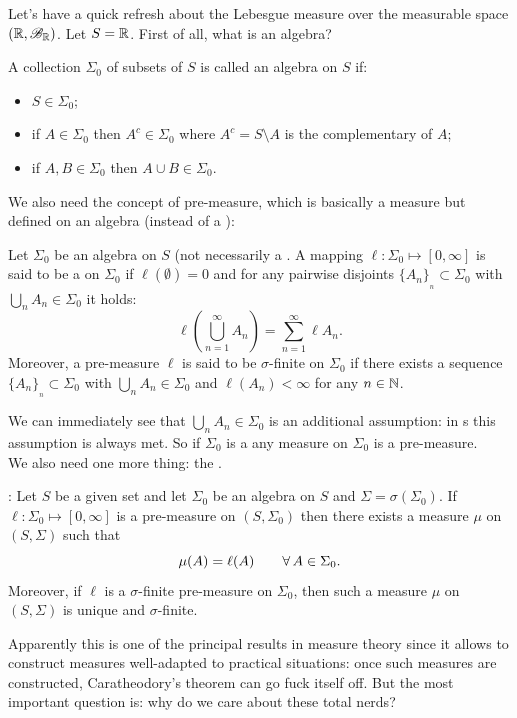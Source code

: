 \documentclass{report}
\begin{document}
\begin{revise}
Let's have a quick refresh about the Lebesgue measure over the measurable space $(\mathbb{R},\mathscr{B}_{\mathbb{R}})$. Let $S=\mathbb{R}$. First of all, what is an algebra?
\begin{definition}
	A collection $\Sigma_0$ of subsets of $S$ is called an algebra on $S$ if:
	\begin{itemize}
		\item $S\in\Sigma_0$;
		\item if $A\in\Sigma_0$ then $A^c\in\Sigma_0$ where $A^c=S\setminus A$ is the complementary of $A$;
		\item if $A,B\in\Sigma_0$ then $A\cup B\in\Sigma_0$.
	\end{itemize}
\end{definition}
We also need the concept of pre-measure, which is basically a measure but defined on an algebra (instead of a \sa{}):
\begin{definition}
	Let $\Sigma_0$ be an algebra on $S$ (not necessarily a \sa{}. A mapping $\ell:\Sigma_0\mapsto[0,\infty]$ is said to be a  on $\Sigma_0$ if $\ell(\emptyset)=0$ and for any pairwise disjoints $\{A_n\}_{_n}\subset\Sigma_0$ with $\bigcup_nA_n\in\Sigma_0$ it holds:
	\[\ell\left(\bigcup_{n=1}^\infty A_n\right)=\sum_{n=1}^{\infty}\ell{A_n}.  \] 
	Moreover, a pre-measure $\ell$ is said to be $\sigma$-finite on $\Sigma_0$ if there exists a sequence $\{A_n\}_{_n}\subset\Sigma_0$ with $\bigcup_nA_n\in\Sigma_0$ and $\ell(A_n)<\infty$ for any $n\in\mathbb{N}$.
\end{definition}
We can immediately see that $\bigcup_nA_n\in\Sigma_0$ is an additional assumption: in \sa s this assumption is always met. So if $\Sigma_0$ is a \sa{} any measure on $\Sigma_0$ is a pre-measure. \\
We also need one more thing: the .
\begin{theorem}
	: Let $S$ be a given set and let $\Sigma_0$ be an algebra on $S$ and $\Sigma=\sigma(\Sigma_0)$. If $\ell:\Sigma_0\mapsto[0,\infty]$ is a pre-measure on $(S,\Sigma_0)$ then there exists a measure $\mu$ on $(S,\Sigma)$ such that
	\[ \mu(A)=\ell(A)\qquad \forall\, A \in \Sigma_0. \]
	Moreover, if $\ell$ is a $\sigma$-finite pre-measure on $\Sigma_0$, then such a measure $\mu$ on $(S,\Sigma)$ is unique and $\sigma$-finite.
\end{theorem}Apparently this is one of the principal results in measure theory since it allows to construct measures well-adapted to practical situations: once such measures are constructed, Caratheodory's theorem can go fuck itself off. But the most important question is: why do we care about these total nerds?

\end{revise}
\end{document}
